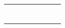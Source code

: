 \begin{columns}[T]
\begin{column}[T]{.70\textwidth}
\begin{longtable}{ m{4cm} m{2cm} m{9cm} m{2cm} m{18cm} m{2cm} m{15cm} }
\begin{minipage}{23cm}
\begin{verbatim}
\end{verbatim}
        \end{minipage}

        \end{longtable}
        \end{column}
        \end{columns}
